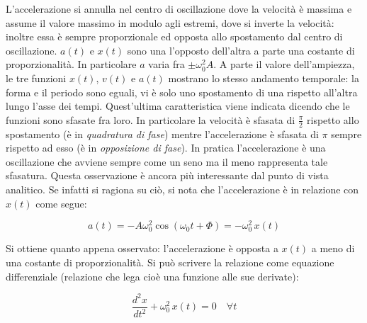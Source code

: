 L'accelerazione si annulla nel centro di oscillazione dove la velocità è massima e assume il valore massimo in modulo agli estremi, dove si inverte la velocità: inoltre essa è sempre proporzionale ed opposta allo spostamento dal centro di oscillazione. $a(t)$ e $x(t)$ sono una l'opposto dell'altra a parte una costante di proporzionalità. In particolare $a$ varia fra $\pm \omega^2_0 A$.
A parte il valore dell'ampiezza, le tre funzioni $x(t)$, $v(t)$ e $a(t)$ mostrano lo stesso andamento temporale: la forma e il periodo sono eguali, vi è solo uno spostamento di una rispetto all'altra lungo l'asse dei tempi. Quest'ultima caratteristica viene indicata dicendo che le funzioni sono sfasate fra loro.
In particolare la velocità è sfasata di $\frac{\pi}{2}$ rispetto allo spostamento (è in \emph{quadratura di fase}) mentre l'accelerazione è sfasata di $\pi$ sempre rispetto ad esso (è in \emph{opposizione di fase}). In pratica l'accelerazione è una oscillazione che avviene sempre come un seno ma il meno rappresenta tale sfasatura. Questa osservazione è ancora più interessante dal punto di vista analitico. Se infatti si ragiona su ciò, si nota che l'accelerazione è in relazione con $x(t)$ come segue:

\[
	a(t)=-A\omega^2_0 \cos(\omega_0 t+\Phi)=-\omega^2_0\,x(t)
\]

Si ottiene quanto appena osservato: l'accelerazione è opposta a $x(t)$ a meno di una costante di proporzionalità.
Si può scrivere la relazione come equazione differenziale (relazione che lega cioè una funzione alle sue derivate):

\[
	\frac{d^2x}{dt^2}+\omega^2_0\,x(t)=0 \quad \forall t
\]

